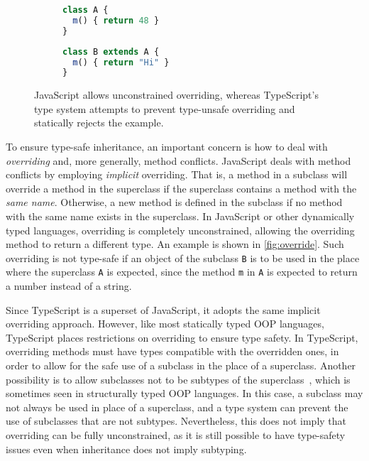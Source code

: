 \begin{figure}
\centering
\begin{subfigure}{.33\textwidth}
\begin{lstlisting}[language=TypeScript]
class A {
  m() { return 48 }
}
\end{lstlisting}
\end{subfigure}
\begin{subfigure}{.33\textwidth}
\begin{lstlisting}[language=TypeScript]
class B extends A {
  m() { return "Hi" }
}
\end{lstlisting}
\end{subfigure}
\caption{JavaScript allows unconstrained overriding, whereas TypeScript's type
  system attempts to prevent type-unsafe overriding and statically rejects the
  example.} \label{fig:override}
\end{figure}

To ensure type-safe inheritance, an important concern is how to deal with
\emph{overriding} and, more generally, method conflicts. JavaScript deals with
method conflicts by employing \emph{implicit} overriding. That is, a method in a
subclass will override a method in the superclass if the superclass contains a
method with the \emph{same name}. Otherwise, a new method is defined in the
subclass if no method with the same name exists in the superclass. In JavaScript
or other dynamically typed languages, overriding is completely unconstrained,
allowing the overriding method to return a different type. An example is shown
in \autoref{fig:override}. Such overriding is not type-safe if an object of the
subclass \lstinline{B} is to be used in the place where the superclass
\lstinline{A} is expected, since the method \lstinline{m} in \lstinline{A} is
expected to return a number instead of a string.

Since TypeScript is a superset of JavaScript, it adopts the same implicit
overriding approach. However, like most statically typed OOP languages,
TypeScript places restrictions on overriding to ensure type safety. In
TypeScript, overriding methods must have types compatible with the overridden
ones, in order to allow for the safe use of a subclass in the place of a
superclass. Another possibility is to allow subclasses not to be subtypes of the
superclass~\citep{cook1990inheritance}, which is sometimes seen in structurally
typed OOP languages. In this case, a subclass may not always be used in place of
a superclass, and a type system can prevent the use of subclasses that are not
subtypes.  Nevertheless, this does not imply that overriding can be fully
unconstrained, as it is still possible to have type-safety issues even when
inheritance does not imply subtyping.

